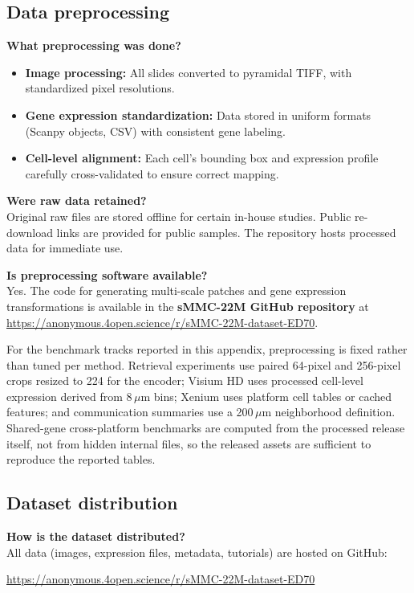 \documentclass{article}
\newcommand{\dataset}{sMMC-22M\xspace}
\begin{document}

\subsection{Data preprocessing}
\noindent
\textbf{What preprocessing was done?} \\
\begin{itemize}
    \item \textbf{Image processing:} All slides converted to pyramidal TIFF, with standardized pixel resolutions.
    \item \textbf{Gene expression standardization:} Data stored in uniform formats (Scanpy objects, CSV) with consistent gene labeling.
    \item \textbf{Cell-level alignment:} Each cell’s bounding box and expression profile carefully cross-validated to ensure correct mapping.
\end{itemize}

\noindent
\textbf{Were raw data retained?} \\
Original raw files are stored offline for certain in-house studies. Public re-download links are provided for public samples. The repository hosts processed data for immediate use.

\noindent
\textbf{Is preprocessing software available?} \\
Yes. The code for generating multi-scale patches and gene expression transformations is available in the \textbf{\dataset GitHub repository} at \url{https://anonymous.4open.science/r/\dataset-dataset-ED70}.

For the benchmark tracks reported in this appendix, preprocessing is fixed rather than tuned per method. Retrieval experiments use paired 64-pixel and 256-pixel crops resized to 224 for the encoder; Visium HD uses processed cell-level expression derived from 8\,$\mu$m bins; Xenium uses platform cell tables or cached features; and communication summaries use a 200\,$\mu$m neighborhood definition. Shared-gene cross-platform benchmarks are computed from the processed release itself, not from hidden internal files, so the released assets are sufficient to reproduce the reported tables.


\subsection{Dataset distribution}
\noindent
\textbf{How is the dataset distributed?} \\
All data (images, expression files, metadata, tutorials) are hosted on GitHub:
\begin{center}
\url{https://anonymous.4open.science/r/\dataset-dataset-ED70}
\end{center}
\end{document}

